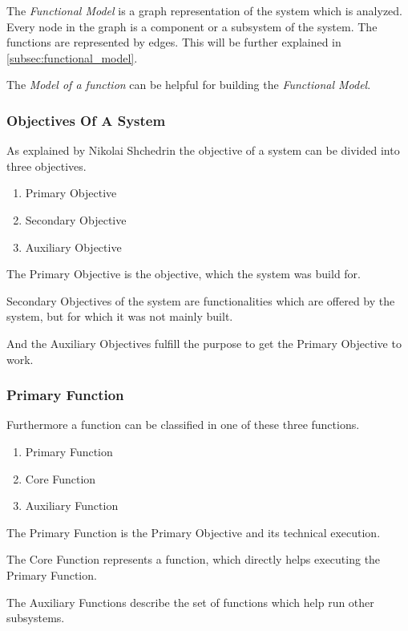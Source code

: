 The \textit{Functional Model} is a graph representation of the system which is analyzed. 
Every node in the graph is a component or a subsystem of the system. 
The functions are represented by edges. 
This will be further explained in \ref{subsec:functional_model}.

The \textit{Model of a function} can be helpful for building the \textit{Functional Model}.

\subsubsection{Objectives Of A System}
\label{subsubsec:objectives_system}

As explained by Nikolai Shchedrin the objective of a system can be divided into three objectives.

\begin{enumerate}[noitemsep]
	\item Primary Objective
	\item Secondary Objective
	\item Auxiliary Objective
\end{enumerate}

The Primary Objective is the objective, which the system was build for. 

Secondary Objectives of the system are functionalities which are offered by the system, but for which it was not mainly built.

And the Auxiliary Objectives fulfill the purpose to get the Primary Objective to work.

\subsubsection{Primary Function}
\label{subsubsec:primary_function}

Furthermore a function can be classified in one of these three functions.

\begin{enumerate}[noitemsep]
	\item Primary Function
	\item Core Function
	\item Auxiliary Function
\end{enumerate}

The Primary Function is the Primary Objective and its technical execution. 

The Core Function represents a function, which directly helps executing the Primary Function.

The Auxiliary Functions describe the set of functions which help run other subsystems.
